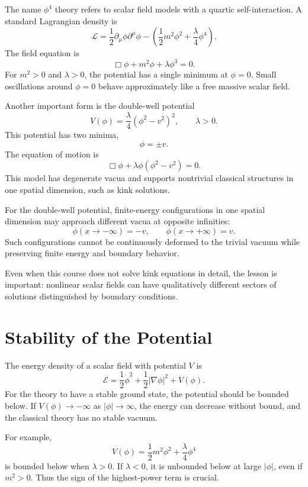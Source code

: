 The name \(\phi^4\) theory refers to scalar field models with a quartic
self-interaction. A standard Lagrangian density is
\[
    \mathcal{L}
    =\frac{1}{2}\partial_\mu\phi\partial^\mu\phi
     -\left(\frac{1}{2}m^2\phi^2+\frac{\lambda}{4}\phi^4\right).
\]
The field equation is
\[
    \Box\phi+m^2\phi+\lambda\phi^3=0.
\]
For \(m^2>0\) and \(\lambda>0\), the potential has a single minimum at
\(\phi=0\). Small oscillations around \(\phi=0\) behave approximately like a free
massive scalar field.

Another important form is the double-well potential
\[
    V(\phi)=\frac{\lambda}{4}(\phi^2-v^2)^2,
    \qquad \lambda>0.
\]
This potential has two minima,
\[
    \phi=\pm v.
\]
The equation of motion is
\[
    \Box\phi+\lambda\phi(\phi^2-v^2)=0.
\]
This model has degenerate vacua and supports nontrivial classical structures in
one spatial dimension, such as kink solutions.

\begin{examplebox}
For the double-well potential, finite-energy configurations in one spatial
dimension may approach different vacua at opposite infinities:
\[
    \phi(x\to-\infty)=-v,
    \qquad
    \phi(x\to+\infty)=v.
\]
Such configurations cannot be continuously deformed to the trivial vacuum while
preserving finite energy and boundary behavior.
\end{examplebox}

Even when this course does not solve kink equations in detail, the lesson is
important: nonlinear scalar fields can have qualitatively different sectors of
solutions distinguished by boundary conditions.

\section{Stability of the Potential}

The energy density of a scalar field with potential \(V\) is
\[
    \mathcal{E}=\frac{1}{2}\dot\phi^2+\frac{1}{2}|\nabla\phi|^2+V(\phi).
\]
For the theory to have a stable ground state, the potential should be bounded
below. If \(V(\phi)\to-\infty\) as \(|\phi|\to\infty\), the energy can decrease
without bound, and the classical theory has no stable vacuum.

For example,
\[
    V(\phi)=\frac{1}{2}m^2\phi^2+\frac{\lambda}{4}\phi^4
\]
is bounded below when \(\lambda>0\). If \(\lambda<0\), it is unbounded below at
large \(|\phi|\), even if \(m^2>0\). Thus the sign of the highest-power term is
crucial.

